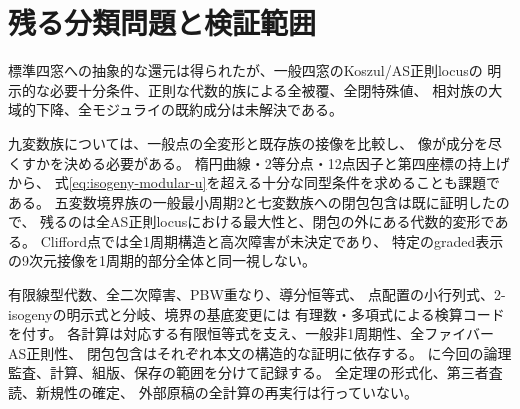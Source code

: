 \documentclass[11pt,a4paper]{ltjsarticle}
\theoremstyle{definition}
\begin{document}





































\section{残る分類問題と検証範囲}
標準四窓への抽象的な還元は得られたが、一般四窓のKoszul/AS正則locusの
明示的な必要十分条件、正則な代数的族による全被覆、全閉特殊値、
相対族の大域的下降、全モジュライの既約成分は未解決である。

九変数族については、一般点の全変形と既存族の接像を比較し、
像が成分を尽くすかを決める必要がある。
楕円曲線・2等分点・12点因子と第四座標の持上げから、
式\eqref{eq:isogeny-modular-u}を超える十分な同型条件を求めることも課題である。
五変数境界族の一般最小周期2と七変数族への閉包包含は既に証明したので、
残るのは全AS正則locusにおける最大性と、閉包の外にある代数的変形である。
Clifford点では全1周期構造と高次障害が未決定であり、
特定のgraded表示の9次元接像を1周期的部分全体と同一視しない。

有限線型代数、全二次障害、PBW重なり、導分恒等式、
点配置の小行列式、2-isogenyの明示式と分岐、境界の基底変更には
有理数・多項式による検算コードを付す。
各計算は対応する有限恒等式を支え、一般非1周期性、全ファイバーAS正則性、
閉包包含はそれぞれ本文の構造的な証明に依存する。
に今回の論理監査、計算、組版、保存の範囲を分けて記録する。
全定理の形式化、第三者査読、新規性の確定、
外部原稿\cite{as4period}の全計算の再実行は行っていない。
\end{document}
